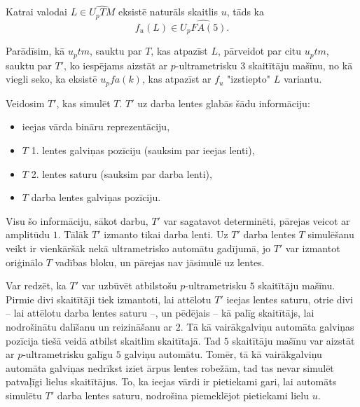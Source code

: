 \documentclass{ludis}
\begin{document}
\begin{lemma}
Katrai valodai $L \in \widehat{U_pTM}$ eksistē naturāls skaitlis $u$, tāds ka
\[
	f_u(L) \in \widehat{U_pFA(5)}.
\]
\end{lemma}
\begin{pieradijums}
Parādīsim, kā $u_ptm$, sauktu par $T$, kas atpazīst $L$, pārveidot par citu $u_ptm$, sauktu par $T'$, ko iespējams aizstāt ar $p$-ultrametrisku $3$ skaitītāju mašīnu, no kā viegli seko, ka eksistē $u_pfa(k)$, kas atpazīst ar $f_u$ "izstiepto" $L$ variantu.

Veidosim $T'$, kas simulēt $T$. $T'$ uz darba lentes glabās šādu informāciju:
\begin{itemize}
	\item ieejas vārda bināru reprezentāciju,
	\item $T$ 1. lentes galviņas pozīciju (sauksim par ieejas lenti),
	\item $T$ 2. lentes saturu (sauksim par darba lenti), %
	\item $T$ darba lentes galviņas pozīciju.
\end{itemize} %
Visu šo informāciju, sākot darbu, $T'$ var sagatavot determinēti, pārejas veicot ar amplitūdu $1$. Tālāk $T'$ izmanto tikai darba lenti. Uz $T'$ darba lentes $T$ simulēšanu veikt ir vienkāršāk nekā ultrametrisko automātu gadījumā, jo $T'$ var izmantot oriģinālo $T$ vadības bloku, un pārejas nav jāsimulē uz lentes.

Var redzēt, ka $T'$ var uzbūvēt atbilstošu $p$-ultrametrisku $5$ skaitītāju mašīnu. Pirmie divi skaitītāji tiek izmantoti, lai attēlotu $T'$ ieejas lentes saturu, otrie divi -- lai attēlotu darba lentes saturu --, un pēdējais -- kā palīg skaitītājs, lai nodrošinātu dalīšanu un reizināšanu ar $2$. Tā kā vairākgalviņu automāta galviņas pozīcija tiešā veidā atbilst skaitlim skaitītajā. Tad $5$ skaitītāju mašīnu var aizstāt ar $p$-ultrametrisku galīgu $5$ galviņu automātu. Tomēr, tā kā vairākgalviņu automāta galviņas nedrīkst iziet ārpus lentes robežām, tad tas nevar simulēt patvaļīgi lielus skaitītājus. To, ka ieejas vārdi ir pietiekami gari, lai automāts simulētu $T'$ darba lentes saturu, nodrošina piemeklējot pietiekami lielu $u$.
\end{pieradijums}
\end{document}
